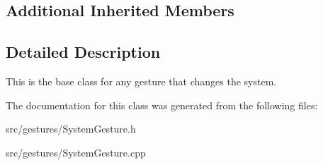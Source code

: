 \subsection*{Additional Inherited Members}


\subsection{Detailed Description}
This is the base class for any gesture that changes the system. 

The documentation for this class was generated from the following files\+:\begin{DoxyCompactItemize}
\item 
src/gestures/System\+Gesture.\+h\item 
src/gestures/System\+Gesture.\+cpp\end{DoxyCompactItemize}

